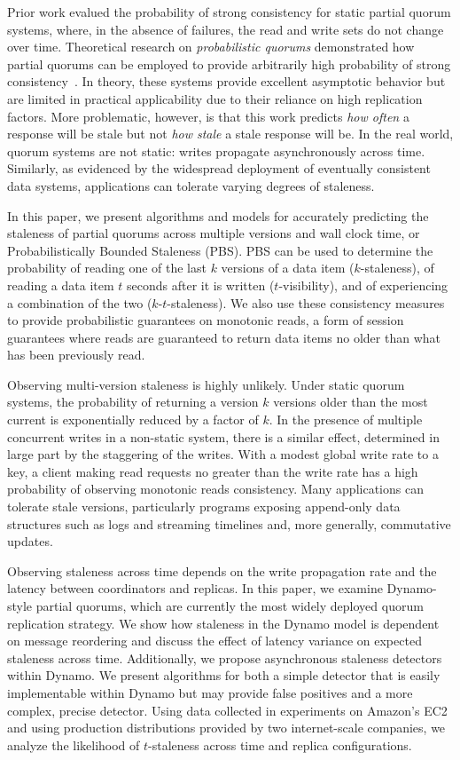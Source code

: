 \documentclass{vldb}
\begin{document}
Prior work evalued the probability of strong consistency for static
partial quorum systems, where, in the absence of failures, the read
and write sets do not change over time.  Theoretical research on
\textit{probabilistic quorums} demonstrated how partial quorums can be
employed to provide arbitrarily high probability of strong
consistency~\cite{prob-quorum}. In theory, these systems provide
excellent asymptotic behavior but are limited in practical
applicability due to their reliance on high replication factors.  More
problematic, however, is that this work predicts \textit{how often} a
response will be stale but not \textit{how stale} a stale response
will be. In the real world, quorum systems are not static: writes
propagate asynchronously across time. Similarly, as evidenced by the
widespread deployment of eventually consistent data systems,
applications can tolerate varying degrees of staleness.

In this paper, we present algorithms and models for accurately
predicting the staleness of partial quorums across multiple versions
and wall clock time, or Probabilistically Bounded Staleness (PBS). PBS
can be used to determine the probability of reading one of the last
$k$ versions of a data item ($k$-staleness), of reading a data item
$t$ seconds after it is written ($t$-visibility), and of experiencing
a combination of the two ($k$-$t$-staleness).  We also use these
consistency measures to provide probabilistic guarantees on monotonic
reads, a form of session guarantees where reads are guaranteed to
return data items no older than what has been previously read.

Observing multi-version staleness is highly unlikely.  Under static
quorum systems, the probability of returning a version $k$ versions
older than the most current is exponentially reduced by a factor of
$k$.  In the presence of multiple concurrent writes in a non-static
system, there is a similar effect, determined in large part by the
staggering of the writes.  With a modest global write rate to a key, a
client making read requests no greater than the write rate has a high
probability of observing monotonic reads consistency.  Many
applications can tolerate stale versions, particularly programs
exposing append-only data structures such as logs and streaming
timelines and, more generally, commutative updates.

Observing staleness across time depends on the write propagation rate
and the latency between coordinators and replicas.  In this paper, we
examine Dynamo-style partial quorums, which are currently the most
widely deployed quorum replication strategy.  We show how staleness in
the Dynamo model is dependent on message reordering and discuss the
effect of latency variance on expected staleness across time.
Additionally, we propose asynchronous staleness detectors within
Dynamo.  We present algorithms for both a simple detector that is
easily implementable within Dynamo but may provide false positives and
a more complex, precise detector.  Using data collected in experiments
on Amazon's EC2 and using production distributions provided by two
internet-scale companies, we analyze the likelihood of $t$-staleness
across time and replica configurations.
\end{document}
